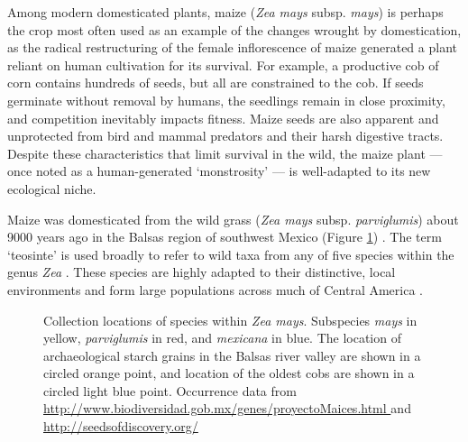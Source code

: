 \documentclass[9pt,twocolumn,twoside]{rilabRxiv}
\begin{document}
﻿Among modern domesticated plants, maize (\textit{Zea mays} subsp. \textit{mays}) is perhaps the crop most often used as an example of the changes wrought by domestication, as the radical restructuring of the female inflorescence of maize generated a plant reliant on human cultivation for its survival.
﻿For example, a productive cob of corn contains hundreds of seeds, but all are constrained to the cob.
If seeds germinate without removal by humans, the seedlings remain in close proximity, and competition inevitably impacts fitness.
﻿Maize seeds are also apparent and unprotected from bird and mammal predators and their harsh digestive tracts.
Despite these characteristics that limit survival in the wild, the maize plant --- once noted as a human-generated `monstrosity' \citep{beadle1972} --- is well-adapted to its new ecological niche.

Maize was domesticated from the wild grass (\textit{Zea mays} subsp. \textit{parviglumis}) about 9000 years ago in the Balsas region of southwest Mexico (Figure \ref{fig:map}) \citep{matsuoka2002, piperno2009}.
The term `teosinte' is used broadly to refer to wild taxa from any of five species within the genus \textit{Zea} \citep{doebley1980, iltis1980}.
These species are highly adapted to their distinctive, local environments \citep{hufford2012maxent, hufford2012review} and form large populations across much of Central America \citep{wilkes1967}.


   \begin{figure}
        \caption{\label{fig:map} Collection locations of species within \textit{Zea mays}. Subspecies \textit{mays} in yellow, \textit{parviglumis} in red, and \textit{mexicana} in blue. The location of archaeological starch grains \citep{piperno2009} in the Balsas river valley are shown in a circled orange point, and location of the oldest cobs \citep{benz2001} are shown in a circled light blue point. Occurrence data from \url{http://www.biodiversidad.gob.mx/genes/proyectoMaices.html
} and \url{http://seedsofdiscovery.org/}}
\end{figure}
\end{document}
